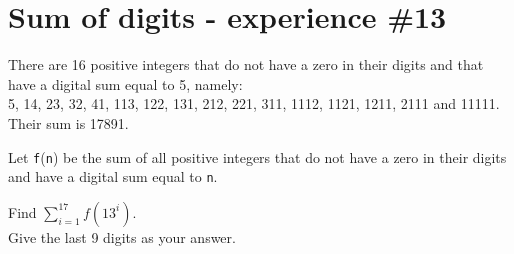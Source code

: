 \section[Problem \#377: Sum of digits - experience \#13]{Sum of digits - experience \#13}
\label{sec:problem_377}

There are 16 positive integers that do not have a zero in their digits
and that have a digital sum equal to 5, namely:\\
5, 14, 23, 32, 41, 113, 122, 131, 212, 221, 311, 1112, 1121, 1211, 2111
and 11111.\\
Their sum is 17891.

Let \texttt{f}(\texttt{n}) be the sum of all positive integers that do
not have a zero in their digits and have a digital sum equal to
\texttt{n}.

Find $\displaystyle \sum_{i=1}^{17} f(13^i)$.\\
Give the last 9 digits as your answer.